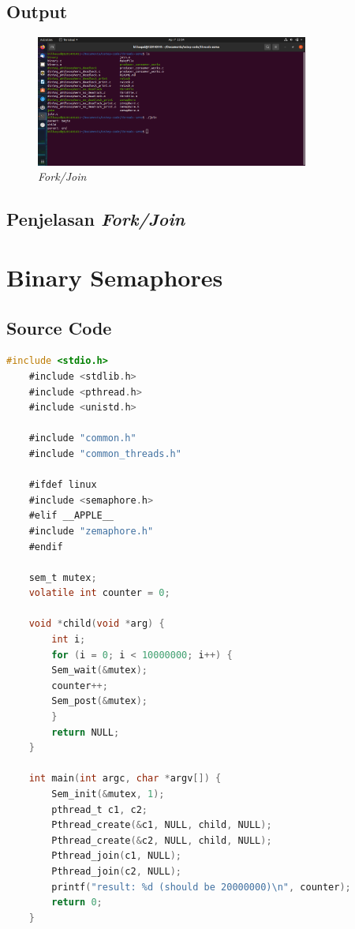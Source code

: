 \documentclass[11pt,a4paper]{article}
\begin{document}
\subsection{Output}
\begin{figure}[h]
	\centering
	\includegraphics[width=0.8\textwidth]{Figure1/fork.png}
	\caption{\textit{Fork/Join}}
\end{figure}

\subsection{Penjelasan \textit{Fork/Join}}


\section{Binary Semaphores}
\subsection{Source Code}
\begin{lstlisting}[language=C]
	#include <stdio.h>
	#include <stdlib.h>
	#include <pthread.h>
	#include <unistd.h>

	#include "common.h"
	#include "common_threads.h"

	#ifdef linux
	#include <semaphore.h>
	#elif __APPLE__
	#include "zemaphore.h"
	#endif

	sem_t mutex;
	volatile int counter = 0;

	void *child(void *arg) {
		int i;
		for (i = 0; i < 10000000; i++) {
		Sem_wait(&mutex);
		counter++;
		Sem_post(&mutex);
		}
		return NULL;
	}

	int main(int argc, char *argv[]) {
		Sem_init(&mutex, 1); 
		pthread_t c1, c2;
		Pthread_create(&c1, NULL, child, NULL);
		Pthread_create(&c2, NULL, child, NULL);
		Pthread_join(c1, NULL);
		Pthread_join(c2, NULL);
		printf("result: %d (should be 20000000)\n", counter);
		return 0;
	}
\end{lstlisting}
\end{document}
